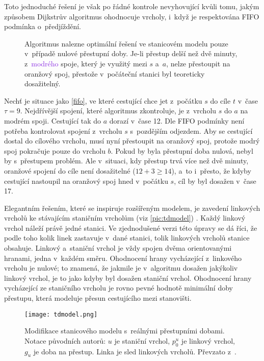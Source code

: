 Toto jednoduché řešení je však po řádné kontrole nevyhovující kvůli tomu, jakým způsobem Dijkstrův algoritmus ohodnocuje vrcholy, i~když je respektována FIFO podmínka o~předjíždění.

\begin{figure}[htbp]
	\centering
	\FIFO
	\caption[Selhání stanicového modelu při zavedení realistických přestupů.]{Algoritmus nalezne optimální řešení ve stanicovém modelu pouze v~případě nulové přestupní doby. Je-li přestup delší než dvě minuty, z~\textcolor{BlueViolet}{modrého} spoje, který je využitý mezi \(s\) a~\(a\), nelze přestoupit na \textcolor{RedOrange}{oranžový} spoj, přestože v~počáteční stanici byl teoreticky dosažitelný.}
	\label{fifo}
\end{figure}

Nechť je situace jako \autoref{fifo}, ve které cestující chce jet z~počátku \(s\) do cíle \(t\) v~čase \(\tau = 9\). Nejdřívější spojení, které algoritmus zkontroluje, je z~vrcholu \(s\) do \(a\) na modrém spoji. Cestující tak do \(a\) dorazí v~čase 12. Dle FIFO podmínky není potřeba kontrolovat spojení z~vrcholu \(s\) s~pozdějším odjezdem. Aby se cestující dostal do cílového vrcholu, musí nyní přestoupit na oranžový spoj, protože modrý spoj pokračuje pouze do vrcholu \(b\). Pokud by byla přestupní doba nulová, nebyl by s~přestupem problém. Ale v~situaci, kdy přestup trvá více než dvě minuty, oranžové spojení do cíle není dosažitelné (\(12+3\geq 14\)), a~to i~přesto, že kdyby cestující nastoupil na oranžový spoj hned v~počátku \(s\), cíl by byl dosažen v~čase 17.


\renewcommand{\figureautorefname}{obrázek}
Elegantním řešením, které se inspiruje rozšířeným modelem, je zavedení linkových vrcholů ke stávajícím staničním vrcholům (viz \autoref{pic:tdmodel}) \cite{pyrga2008efficient}. Každý linkový vrchol náleží právě jedné stanici. Ve zjednodušené verzi této úpravy se dá říci, že podle toho kolik linek zastavuje v~dané stanici, tolik linkových vrcholů stanice obsahuje. Linkový a~staniční vrchol je vždy spojen dvěma orientovanými hranami, jedna v~každém směru. Ohodnocení hrany vycházející z~linkového vrcholu je nulové; to znamená, že jakmile je v~algoritmu dosažen jakýkoliv linkový vrchol, je to jako kdyby byl dosažen staniční vrchol. Ohodnocení hrany vycházející ze staničního vrcholu je rovno pevné hodnotě minimální doby přestupu, která modeluje přesun cestujícího mezi stanovišti.

\begin{figure}[htbp]
	\centering
	\texttt{[image: tdmodel.png]}
	\caption[Modifikace stanicového modelu s~reálnými přestupními dobami.]{Modifikace stanicového modelu s~reálnými přestupními dobami. Notace původních autorů: \(u\) je staniční vrchol, \(p_{0}^{u}\) je linkový vrchol, \(g_u\) je doba na přestup. Linka je sled linkových vrcholů. Převzato z~\cite{pyrga2008efficient}.}
	\label{pic:tdmodel}
\end{figure}

